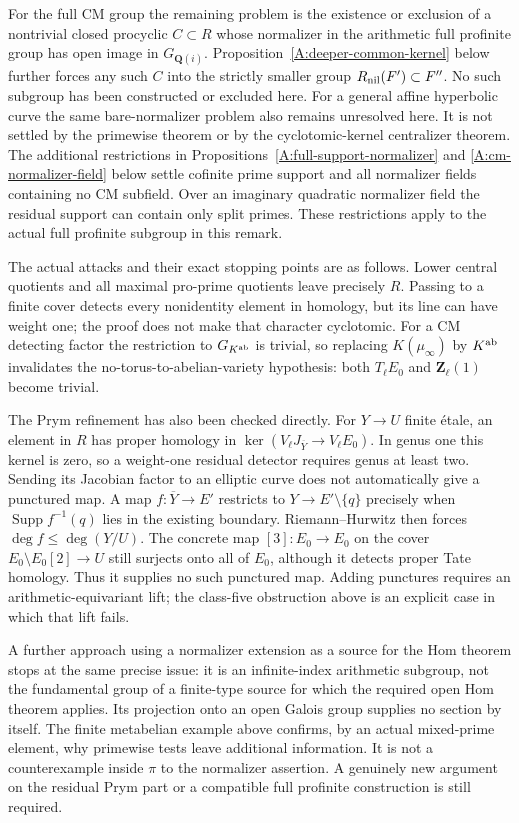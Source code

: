 \begin{remark}
\label{A:cm-common-kernel}
For the full CM group the remaining problem is
the existence or exclusion of a nontrivial
closed procyclic $C\subset R$ whose normalizer
in the arithmetic full profinite group has
open image in $G_{\mathbf Q(i)}$. Proposition~\ref{A:deeper-common-kernel}
below further forces any such $C$ into the strictly smaller
group $R_{\rm nil}(F')\subset F''$. No such
subgroup has been constructed or excluded
here.  For a general affine hyperbolic curve
the same bare-normalizer problem also remains
unresolved here.  It is not settled by the
primewise theorem or by the cyclotomic-kernel
centralizer theorem.
The additional restrictions in
Propositions~\ref{A:full-support-normalizer} and
\ref{A:cm-normalizer-field} below settle cofinite prime support
and all normalizer fields containing no CM subfield. Over an
imaginary quadratic normalizer field the residual support
can contain only split primes. These restrictions apply
to the actual full profinite subgroup in this remark.

The actual attacks and their exact stopping
points are as follows.  Lower central
quotients and all maximal pro-prime quotients
leave precisely $R$.  Passing to a finite
cover detects every nonidentity element in
homology, but its line can have weight one;
the proof does not make that character
cyclotomic.  For a CM detecting factor the
restriction to $G_{K^{\rm ab}}$ is trivial,
so replacing $K(\mu_\infty)$ by $K^{\rm ab}$
invalidates the no-torus-to-abelian-variety
hypothesis: both $T_\ell E_0$ and
$\mathbf Z_\ell(1)$ become trivial.

The Prym refinement has also been checked
directly.  For $Y\to U$ finite \'etale,
an element in $R$ has proper homology in
$\ker(V_\ell J_{\overline Y}\to V_\ell E_0)$.
In genus one this kernel is zero, so a
weight-one residual detector requires genus
at least two.  Sending its Jacobian factor
to an elliptic curve does not automatically
give a punctured map.  A map
$f:\overline Y\to E'$ restricts to
$Y\to E'\setminus\{q\}$ precisely when
$\operatorname{Supp}f^{-1}(q)$ lies in the
existing boundary.  Riemann--Hurwitz then
forces $\deg f\leq\deg(Y/U)$.  The concrete
map $[3]:E_0\to E_0$ on the cover
$E_0\setminus E_0[2]\to U$ still surjects
onto all of $E_0$, although it detects
proper Tate homology.  Thus it supplies
no such punctured map.  Adding punctures
requires an arithmetic-equivariant lift;
the class-five obstruction above is an
explicit case in which that lift fails.

A further approach using a normalizer
extension as a source for the Hom theorem
stops at the same precise issue: it is
an infinite-index arithmetic subgroup,
not the fundamental group of a finite-type
source for which the required open Hom
theorem applies.  Its projection onto an
open Galois group supplies no section by
itself.  The finite metabelian example
above confirms, by an actual mixed-prime
element, why primewise tests leave
additional information.  It is not a
counterexample inside $\pi$ to the
normalizer assertion.  A genuinely new
argument on the residual Prym part or
a compatible full profinite construction
is still required.
\end{remark}

